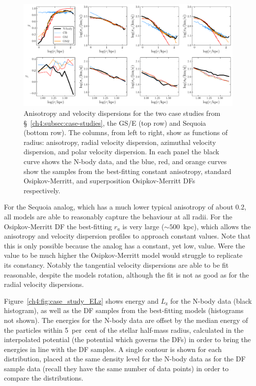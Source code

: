 \begin{figure}
    \centering
    \includegraphics[width=\textwidth]{figure/ch4/beta_vdisp.pdf}
    \caption{Anisotropy and velocity dispersions for the two case studies from \S~\ref{ch4:subsec:case-studies}, the GS/E (top row) and Sequoia (bottom row). The columns, from left to right, show as functions of radius: anisotropy, radial velocity dispersion, azimuthal velocity dispersion, and polar velocity dispersion. In each panel the black curve shows the N-body data, and the blue, red, and orange curves show the samples from the best-fitting constant anisotropy, standard Osipkov-Merritt, and superposition Osipkov-Merritt DFs respectively.}
    \label{ch4:fig:case_study_beta_vdisp}
\end{figure}

For the Sequoia analog, which has a much lower typical anisotropy of about 0.2, all models are able to reasonably capture the behaviour at all radii. For the Osipkov-Merritt DF the best-fitting $r_{a}$ is very large ($\sim 500$~kpc), which allows the anisotropy and velocity dispersion profiles to approach constant values. Note that this is only possible because the analog has a constant, yet low, value. Were the value to be much higher the Osipkov-Merritt model would struggle to replicate its constancy. Notably the tangential velocity dispersions are able to be fit reasonable, despite the models rotation, although the fit is not as good as for the radial velocity dispersions.

Figure~\ref{ch4:fig:case_study_ELz} shows energy and $L_\mathrm{z}$ for the N-body data (black histogram), as well as the DF samples from the best-fitting models (histograms not shown). The energies for the N-body data are offset by the median energy of the particles within 5~per~cent of the stellar half-mass radius, calculated in the interpolated potential (the potential which governs the DFs) in order to bring the energies in line with the DF samples. A single contour is shown for each distribution, placed at the same density level for the N-body data as for the DF sample data (recall they have the same number of data points) in order to compare the distributions.

